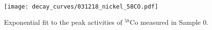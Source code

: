 \begin{figure}[htb]
\texttt{[image: decay\_curves/031218\_nickel\_58CO.pdf]}
\caption{Exponential fit to the peak activities of $^{58}$Co measured in Sample 0.
}
\label{fig:031218_nickel_58CO}
\end{figure}

